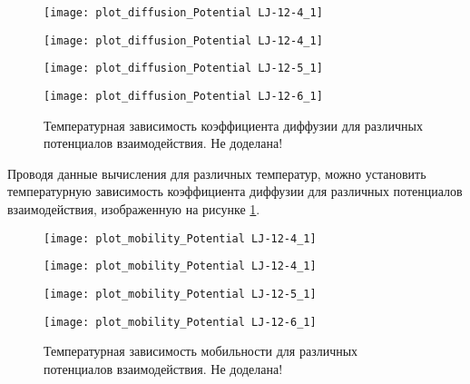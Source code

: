 \begin{figure}[h]
\begin{center}
\begin{minipage}[h]{0.45\linewidth}
\texttt{[image: plot\_diffusion\_Potential LJ-12-4\_1]}
\end{minipage}
\begin{minipage}[h]{0.45\linewidth}
\texttt{[image: plot\_diffusion\_Potential LJ-12-4\_1]}
\end{minipage}
\begin{minipage}[h]{0.45\linewidth}
\texttt{[image: plot\_diffusion\_Potential LJ-12-5\_1]}
\end{minipage}
\begin{minipage}[h]{0.45\linewidth}
\texttt{[image: plot\_diffusion\_Potential LJ-12-6\_1]}
\end{minipage}
\caption{Температурная зависимость коэффициента диффузии для различных потенциалов взаимодействия. Не доделана!}
\label{risD}
\end{center}
\end{figure}

Проводя данные вычисления для различных температур, можно установить температурную зависимость коэффициента диффузии для различных потенциалов взаимодействия, изображенную на рисунке \ref{risD}.

\begin{figure}[htbp!]
\begin{center}
\begin{minipage}[h]{0.45\linewidth}
\texttt{[image: plot\_mobility\_Potential LJ-12-4\_1]}
\end{minipage}
\begin{minipage}[h]{0.45\linewidth}
\texttt{[image: plot\_mobility\_Potential LJ-12-4\_1]}
\end{minipage}
\begin{minipage}[h]{0.45\linewidth}
\texttt{[image: plot\_mobility\_Potential LJ-12-5\_1]}
\end{minipage}
\begin{minipage}[h]{0.45\linewidth}
\texttt{[image: plot\_mobility\_Potential LJ-12-6\_1]}
\end{minipage}
\caption{Температурная зависимость мобильности для различных потенциалов взаимодействия. Не доделана!}
\label{ris18}
\end{center}
\end{figure}

